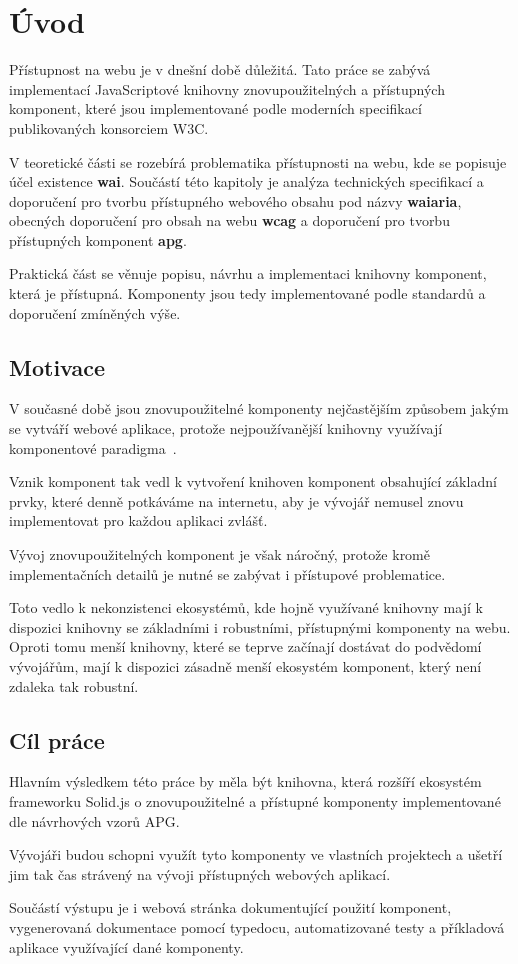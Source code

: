 \chapter{Úvod}

Přístupnost na webu je v dnešní době důležitá. Tato práce se zabývá implementací JavaScriptové knihovny
znovupoužitelných a přístupných komponent, které jsou implementované podle moderních specifikací publikovaných konsorciem W3C.

V teoretické části se rozebírá problematika přístupnosti na webu, kde se popisuje účel existence \textbf{\gls{wai}}.
Součástí této kapitoly je analýza technických specifikací a doporučení pro tvorbu přístupného webového obsahu
pod názvy \textbf{\gls{waiaria}}, obecných doporučení pro obsah na webu \textbf{\gls{wcag}} a doporučení pro tvorbu přístupných komponent \textbf{\gls{apg}}.

Praktická část se věnuje popisu, návrhu a implementaci knihovny komponent,
která je přístupná. Komponenty jsou tedy implementované podle standardů a doporučení zmíněných výše.

\section{Motivace}

V současné době jsou znovupoužitelné komponenty nejčastějším způsobem jakým se vytváří webové aplikace, protože nejpoužívanější knihovny využívají komponentové paradigma~\cite{react,vue,solid,svelte}.

Vznik komponent tak vedl k vytvoření knihoven komponent obsahující základní prvky, které denně potkáváme na internetu, aby je vývojář nemusel znovu implementovat pro každou aplikaci zvlášť.

Vývoj znovupoužitelných komponent je však náročný, protože kromě implementačních detailů je nutné se zabývat i přístupové problematice.

Toto vedlo k nekonzistenci ekosystémů, kde hojně využívané knihovny mají k dispozici knihovny se základními i robustními, přístupnými komponenty na webu. Oproti tomu menší knihovny, které se teprve začínají dostávat do podvědomí vývojářům, mají k dispozici zásadně menší ekosystém komponent, který není zdaleka tak robustní.

\section{Cíl práce}

Hlavním výsledkem této práce by měla být knihovna, která rozšíří ekosystém frameworku Solid.js o znovupoužitelné a přístupné komponenty implementované dle návrhových vzorů APG.

Vývojáři budou schopni využít tyto komponenty ve vlastních projektech a ušetří jim tak čas strávený na vývoji přístupných webových aplikací.

Součástí výstupu je i webová stránka dokumentující použití komponent, vygenerovaná dokumentace pomocí typedocu, automatizované testy a příkladová aplikace využívající dané komponenty.
